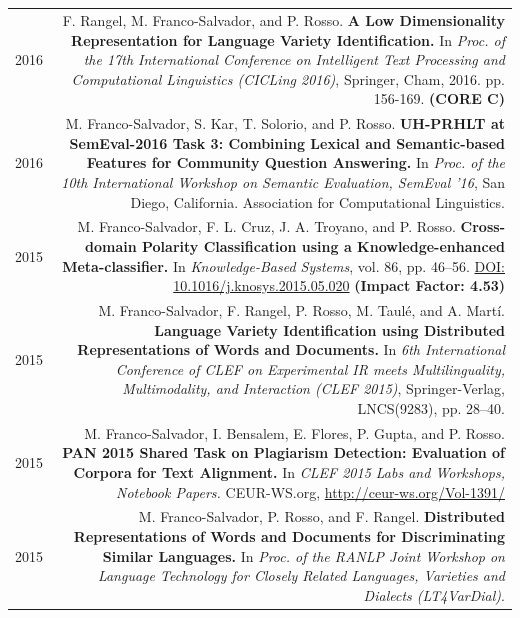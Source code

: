 \documentclass[10pt]{article}
\begin{document}
\section*{}
\begin{tabular}{L!{\VRule}R}
	2016 &F. Rangel, M. Franco-Salvador, and P. Rosso. \textbf{A Low Dimensionality Representation for Language Variety Identification.} In \emph{Proc.  of  the  17th  International Conference on Intelligent Text Processing and Computational Linguistics (CICLing 2016)}, Springer, Cham, 2016. pp. 156-169. \textbf{(CORE C)} \vspace{5pt}\\
	2016 &M. Franco-Salvador, S. Kar, T. Solorio, and P. Rosso. \textbf{UH-PRHLT at SemEval-2016 Task 3: Combining Lexical and Semantic-based Features for Community Question Answering.} In \emph{Proc. of the 10th International Workshop on Semantic Evaluation, SemEval '16}, San Diego, California. Association for Computational Linguistics. \vspace{5pt}\\
    2015&M. Franco-Salvador, F. L. Cruz, J. A. Troyano, and P. Rosso. \textbf{Cross-domain Polarity Classification using a Knowledge-enhanced Meta-classifier.}	
	In \emph{Knowledge-Based Systems}, vol. 86, pp. 46--56. \href{http://dx.doi.org/10.1016/j.knosys.2015.05.020}{DOI: 10.1016/j.knosys.2015.05.020} \textbf{(Impact Factor: 4.53)} \vspace{5pt}\\
	2015&M. Franco-Salvador, F. Rangel, P. Rosso, M. Taul{\'e}, and A. Mart{\'i}. \textbf{Language Variety Identification using Distributed Representations of Words and Documents.}
	In \emph{6th International Conference of CLEF on Experimental IR meets Multilinguality, Multimodality, and Interaction (CLEF 2015)}, Springer-Verlag, LNCS(9283), pp. 28--40. \vspace{5pt}\\
	2015&M. Franco-Salvador, I. Bensalem, E. Flores, P. Gupta, and P. Rosso. \textbf{PAN 2015 Shared Task on Plagiarism Detection: Evaluation of Corpora for Text Alignment.}
	In \emph{CLEF 2015 Labs and Workshops, Notebook Papers.} CEUR-WS.org, \href{http://ceur-ws.org/Vol-1391/}{http://ceur-ws.org/Vol-1391/} \vspace{5pt}\\
	2015&M. Franco-Salvador, P. Rosso, and F. Rangel. \textbf{Distributed Representations of Words and Documents for Discriminating Similar Languages.}
	In \emph{Proc. of the RANLP Joint Workshop on Language Technology for Closely Related Languages, Varieties and Dialects (LT4VarDial)}. \vspace{5pt}\\

\end{tabular}
\end{document}
